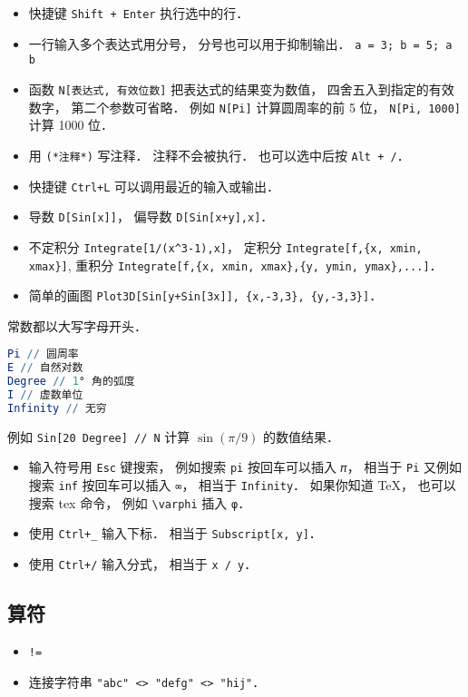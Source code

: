 
\begin{issues}
\issueDraft
\end{issues}


\begin{itemize}
\item 快捷键 \verb|Shift + Enter| 执行选中的行．
\item 一行输入多个表达式用分号， 分号也可以用于抑制输出． \verb|a = 3; b = 5; a b|
\item 函数 \verb|N[表达式, 有效位数]| 把表达式的结果变为数值， 四舍五入到指定的有效数字， 第二个参数可省略． 例如 \verb|N[Pi]| 计算圆周率的前 5 位， \verb|N[Pi, 1000]| 计算 1000 位．
\item 用 \verb|(*注释*)| 写注释． 注释不会被执行． 也可以选中后按 \verb|Alt + /|．
\item 快捷键 \verb|Ctrl+L| 可以调用最近的输入或输出．
\item 导数 \verb|D[Sin[x]]|， 偏导数 \verb|D[Sin[x+y],x]|．
\item 不定积分 \verb|Integrate[1/(x^3-1),x]|， 定积分 \verb|Integrate[f,{x, xmin, xmax}]|, 重积分 \verb|Integrate[f,{x, xmin, xmax},{y, ymin, ymax},...]|．
\item 简单的画图 \verb|Plot3D[Sin[y+Sin[3x]], {x,-3,3}, {y,-3,3}]|．
\end{itemize}

常数都以大写字母开头．
\begin{lstlisting}[language=Mathematica]
Pi // 圆周率
E // 自然对数
Degree // 1° 角的弧度
I // 虚数单位
Infinity // 无穷
\end{lstlisting}
例如 \verb|Sin[20 Degree] // N| 计算 $\sin(\pi/9)$ 的数值结果．

\begin{itemize}
\item 输入符号用 \verb|Esc| 键搜索， 例如搜索 \verb|pi| 按回车可以插入 \verb|𝜋|， 相当于 \verb|Pi| 又例如搜索 \verb|inf| 按回车可以插入 \verb|∞|， 相当于 \verb|Infinity|． 如果你知道 TeX， 也可以搜索 tex 命令， 例如 \verb|\varphi| 插入 \verb|φ|．
\item 使用 \verb|Ctrl+_| 输入下标． 相当于 \verb|Subscript[x, y]|．
\item 使用 \verb|Ctrl+/| 输入分式， 相当于 \verb|x / y|．
\end{itemize}


\subsection{算符}
\begin{itemize}
\item \verb|!=|
\item 连接字符串 \verb|"abc" <> "defg" <> "hij"|．
\end{itemize}

